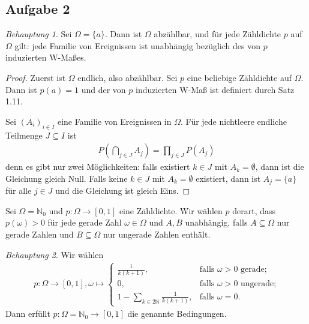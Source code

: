 \documentclass[fleqn,draft,a5paper]{article}
\theoremstyle{remark}
\newtheorem*{Behauptung}{Behauptung}
\begin{document}
\subsection{Aufgabe 2}
\begin{Behauptung}
  Sei $\Omega = \{a\}$.  Dann ist $\Omega$ abzählbar, und für jede
  Zähldichte $p$ auf $\Omega$ gilt: jede Familie von Ereignissen ist
  unabhängig bezüglich des von $p$ induzierten W-Maßes.
\end{Behauptung}
\begin{proof}
  Zuerst ist $\Omega$ endlich, also abzählbar. Sei $p$ eine beliebige
  Zähldichte auf $\Omega$.  Dann ist $p(a) = 1$ und der von $p$
  induzierten W-Maß ist definiert durch Satz 1.11.

  Sei $(A_{i})_{i \in I}$ eine Familie von Ereignissen in $\Omega$.  Für
  jede nichtleere endliche Teilmenge $J \subseteq I$ ist
  \begin{align*}
    P\left(\bigcap_{j \in J} A_{j}\right) = \prod_{j \in J}P(A_{j})
  \end{align*}
  denn es gibt nur zwei Möglichkeiten: falls existiert $k \in J$ mit
  $A_{k} = \emptyset$, dann ist die Gleichung gleich Null.  Falls keine $k
  \in J$ mit $A_{k} = \emptyset$ existiert, dann ist $A_{j} = \{a\}$ für
  alle $j \in J$ und die Gleichung ist gleich Eins.
\end{proof}
Sei $\Omega = \mathbb{N}_{0}$ und $p\colon \Omega \to \left[0, 1\right]$ eine
Zähldichte.  Wir wählen $p$ derart, dass $p(\omega) > 0$ für jede
gerade Zahl $\omega \in \Omega$ und $A, B $ unabhängig, falls $A \subseteq \Omega$ nur
gerade Zahlen und $B \subseteq \Omega$ nur ungerade Zahlen enthält.
\begin{Behauptung}
  Wir wählen
  \begin{align*}
    p\colon \Omega \to \left[0, 1\right], \omega \mapsto
    \begin{cases}
      \frac{1}{k(k+1)}, & \text{falls $\omega > 0$ gerade;} \\
      0, & \text{falls $\omega > 0$ ungerade;} \\
      1 - \sum_{k \in 2 \mathbb{N}}{\frac{1}{k(k+1)}}, & \text{falls $\omega = 0$.}
    \end{cases}
  \end{align*}
  Dann erfüllt $p\colon \Omega = \mathbb{N}_{0} \to \left[0, 1\right]$ die genannte Bedingungen.
\end{Behauptung}
\end{document}
